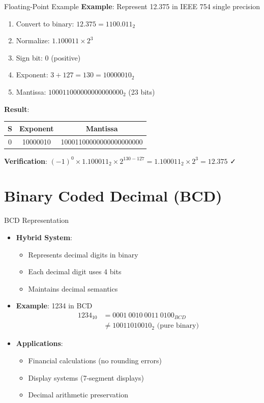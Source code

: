 \documentclass[aspectratio=169,11pt]{beamer}
\newcommand{\concept}[1]{\textbf{\color{accentcolor}#1}}
\begin{document}
\begin{frame}{Floating-Point Example}
\concept{Example}: Represent 12.375 in IEEE 754 single precision

\vspace{0.3cm}
\begin{enumerate}
\item Convert to binary: $12.375 = 1100.011_2$
\item Normalize: $1.100011 \times 2^3$
\item Sign bit: 0 (positive)
\item Exponent: $3 + 127 = 130 = 10000010_2$
\item Mantissa: $100011000000000000000_2$ (23 bits)
\end{enumerate}

\vspace{0.3cm}
\concept{Result}: 
\begin{center}
\begin{tabular}{|c|c|c|}
\hline
\textbf{S} & \textbf{Exponent} & \textbf{Mantissa} \\
\hline
0 & 10000010 & 10001100000000000000000 \\
\hline
\end{tabular}
\end{center}

\concept{Verification}: $(-1)^0 \times 1.100011_2 \times 2^{130-127} = 1.100011_2 \times 2^3 = 12.375$ ✓
\end{frame}

\section{Binary Coded Decimal (BCD)}

\begin{frame}{BCD Representation}
\begin{itemize}
\item \concept{Hybrid System}:
\begin{itemize}
\item Represents decimal digits in binary
\item Each decimal digit uses 4 bits
\item Maintains decimal semantics
\end{itemize}
\vspace{0.5cm}
\item \concept{Example}: 1234 in BCD
\begin{align}
1234_{10} &= 0001\ 0010\ 0011\ 0100_{BCD}\\
&\neq 10011010010_2 \text{ (pure binary)}
\end{align}
\vspace{0.3cm}
\item \concept{Applications}:
\begin{itemize}
\item Financial calculations (no rounding errors)
\item Display systems (7-segment displays)
\item Decimal arithmetic preservation
\end{itemize}
\end{itemize}
\end{frame}
\end{document}
